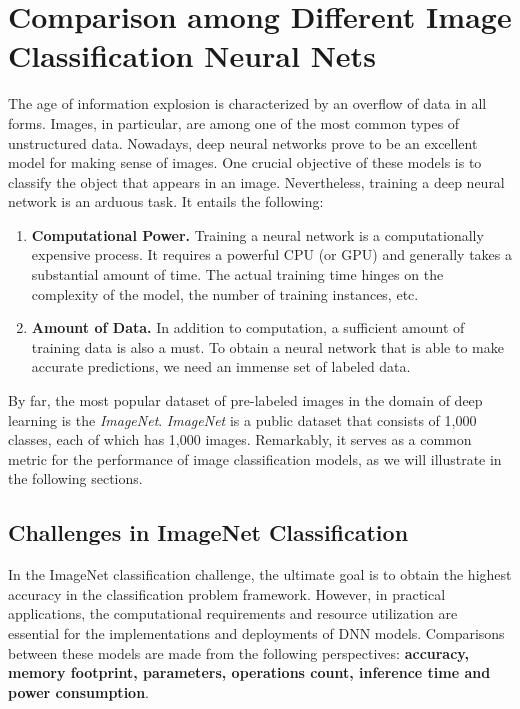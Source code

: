 \chapter{Comparison among Different Image Classification Neural Nets}
The age of information explosion is characterized by an overflow of data in all forms. Images, in particular, are among one of the most common types of unstructured data. Nowadays, deep neural networks prove to be an excellent model for making sense of images. One crucial objective of these models is to classify the object that appears in an image. Nevertheless, training a deep neural network is an arduous task. It entails the following:

\begin{enumerate}
    \item \textbf{Computational Power.}
    Training a neural network is a computationally expensive process. It requires a powerful CPU (or GPU) and generally takes a substantial amount of time. The actual training time hinges on the complexity of the model, the number of training instances, etc.
    \item \textbf{Amount of Data.}
    In addition to computation, a sufficient amount of training data is also a must. To obtain a neural network that is able to make accurate predictions, we need an immense set of labeled data.
\end{enumerate}

By far, the most popular dataset of pre-labeled images in the domain of deep learning is the \textit{ImageNet}. \textit{ImageNet} is a public dataset that consists of 1,000 classes, each of which has 1,000 images. Remarkably, it serves as a common metric for the performance of image classification models, as we will illustrate in the following sections.

\section{Challenges in ImageNet Classification}
In the ImageNet classification challenge, the ultimate goal is to obtain the highest accuracy in the classification problem framework. However, in practical applications, the computational requirements and resource utilization are essential for the implementations and deployments of DNN models. Comparisons between these models are made from the following perspectives: \textbf{accuracy, memory footprint, parameters, operations count, inference time and power consumption}.

